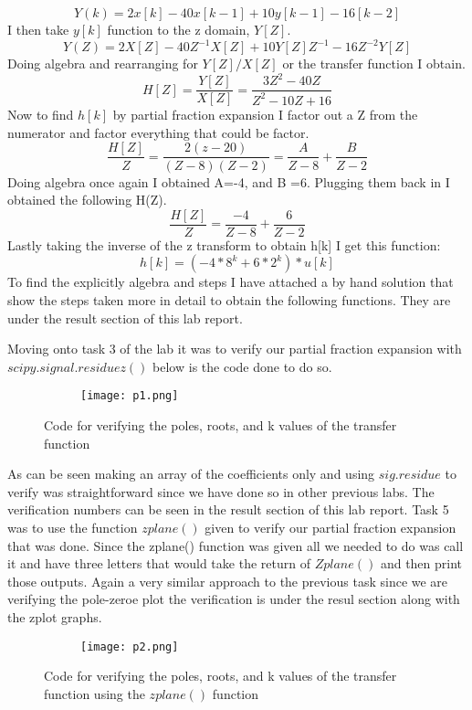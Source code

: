 \documentclass[12pt,a4paper]{article}
\begin{document}
\[Y(k) = 2x[k]-40x[k-1]+10y[k-1]-16[k-2]\]
I then take $y[k]$ function to the z domain, $Y[Z]$.
\[Y(Z) = 2X[Z]-40Z^{-1}X[Z]+10Y[Z]Z^{-1}-16Z^{-2}Y[Z]\]
Doing algebra and rearranging for $Y[Z]/X[Z]$ or the transfer function I obtain.
\[H[Z]=\frac{Y[Z]}{X[Z]} = \frac{3Z^{2}-40Z}{Z^{2}-10Z+16}\]
Now to find  $h[k]$ by partial fraction expansion I factor out a Z from the numerator and factor everything that could be factor.
\[\frac{H[Z]}{Z} = \frac{2(z-20)}{(Z-8)(Z-2)}=\frac{A}{Z-8}+\frac{B}{Z-2}\]
Doing algebra once again I obtained A=-4, and B =6. Plugging them back in I obtained the following H(Z).
\[\frac{H[Z]}{Z} = \frac{-4}{Z-8}+\frac{6}{Z-2}\]
Lastly taking the inverse of the z transform to obtain h[k] I get this function:
\[h[k] = (-4*8^{k}+6*2^{k})*u[k]\]
To find the explicitly algebra and steps I have attached a by hand solution that show the steps taken more in detail to obtain the following functions. They are under the result section of this lab report.
\clearpage




Moving onto task 3 of the lab it was to verify our partial fraction expansion with $scipy.signal.residuez()$ below is the code done to do so.


\begin{figure}[h]
\begin{subfigure}{ 1\textwidth}
\texttt{[image: p1.png]}
\end{subfigure}
\caption{Code for verifying the poles, roots, and k values of the transfer function}
\label{fig:image2}
\end{figure}

As can be seen making an array of the coefficients only and using $sig.residue$ to verify was straightforward since we have done so in other previous labs. The verification numbers can be seen in the result section of this lab report. Task 5 was to use the function $zplane()$ given to verify our partial fraction expansion that was done. Since the zplane() function was given all we needed to do was call it and have three letters that would take the return of $Zplane()$ and then print those outputs. Again a very similar approach to the previous task since we are verifying the pole-zeroe plot the verification is under the resul section along with the zplot graphs.\clearpage




\begin{figure}[h]
\begin{subfigure}{ 1\textwidth}
\texttt{[image: p2.png]}
\end{subfigure}
\caption{Code for verifying the poles, roots, and k values of the transfer function using the $zplane() $ function}
\label{fig:image2}
\end{figure}
\end{document}

